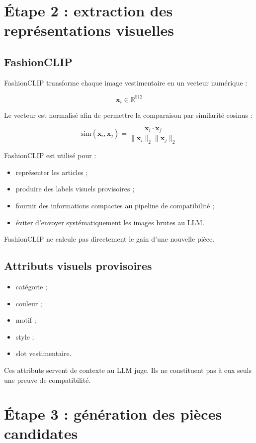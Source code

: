 \documentclass[11pt,a4paper]{article}
\begin{document}
\section{Étape 2 : extraction des représentations visuelles}

\subsection{FashionCLIP}

FashionCLIP transforme chaque image vestimentaire en un vecteur numérique :

\[
\mathbf{x}_i \in \mathbb{R}^{512}
\]

Le vecteur est normalisé afin de permettre la comparaison par similarité
cosinus :

\[
\mathrm{sim}(\mathbf{x}_i,\mathbf{x}_j)
=
\frac{\mathbf{x}_i\cdot\mathbf{x}_j}
{\|\mathbf{x}_i\|_2\|\mathbf{x}_j\|_2}
\]

FashionCLIP est utilisé pour :

\begin{itemize}[leftmargin=*]
    \item représenter les articles ;
    \item produire des labels visuels provisoires ;
    \item fournir des informations compactes au pipeline de compatibilité ;
    \item éviter d'envoyer systématiquement les images brutes au LLM.
\end{itemize}

FashionCLIP ne calcule pas directement le gain d'une nouvelle pièce.

\subsection{Attributs visuels provisoires}

\begin{itemize}[leftmargin=*]
    \item catégorie ;
    \item couleur ;
    \item motif ;
    \item style ;
    \item slot vestimentaire.
\end{itemize}

Ces attributs servent de contexte au LLM juge. Ils ne constituent pas à eux
seuls une preuve de compatibilité.

\section{Étape 3 : génération des pièces candidates}
\end{document}
